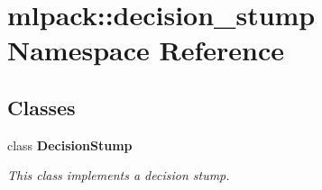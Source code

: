 \section{mlpack\-:\-:decision\-\_\-stump Namespace Reference}
\label{namespacemlpack_1_1decision__stump}
\subsection*{Classes}
\begin{DoxyCompactItemize}
\item 
class {\bf Decision\-Stump}
\begin{DoxyCompactList}\small\item\em This class implements a decision stump. \end{DoxyCompactList}\end{DoxyCompactItemize}
